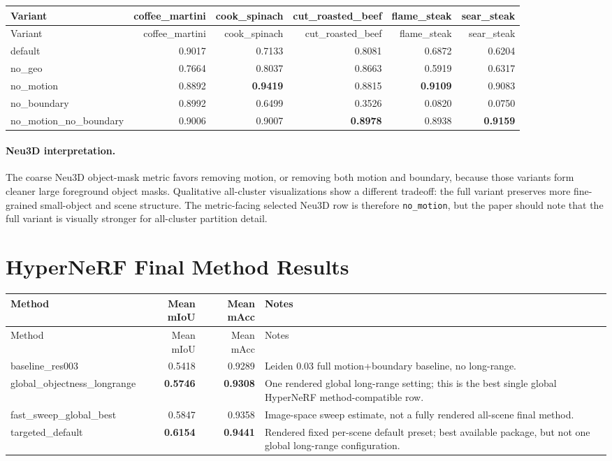 \documentclass[10pt]{article}
\begin{document}
\small
\begin{longtable}{lrrrrr}
\toprule
Variant & coffee\_martini & cook\_spinach & cut\_roasted\_beef & flame\_steak & sear\_steak \\
\midrule
\endfirsthead
\toprule
Variant & coffee\_martini & cook\_spinach & cut\_roasted\_beef & flame\_steak & sear\_steak \\
\midrule
\endhead
default & 0.9017 & 0.7133 & 0.8081 & 0.6872 & 0.6204 \\
no\_geo & 0.7664 & 0.8037 & 0.8663 & 0.5919 & 0.6317 \\
no\_motion & 0.8892 & \textbf{0.9419} & 0.8815 & \textbf{0.9109} & 0.9083 \\
no\_boundary & 0.8992 & 0.6499 & 0.3526 & 0.0820 & 0.0750 \\
no\_motion\_no\_boundary & 0.9006 & 0.9007 & \textbf{0.8978} & 0.8938 & \textbf{0.9159} \\
\bottomrule
\end{longtable}
\normalsize

\paragraph{Neu3D interpretation.}
The coarse Neu3D object-mask metric favors removing motion, or removing both motion and boundary, because those variants form cleaner large foreground object masks.  Qualitative all-cluster visualizations show a different tradeoff: the full variant preserves more fine-grained small-object and scene structure.  The metric-facing selected Neu3D row is therefore \texttt{no\_motion}, but the paper should note that the full variant is visually stronger for all-cluster partition detail.

\section{HyperNeRF Final Method Results}
\small
\begin{longtable}{lrrp{7.6cm}}
\toprule
Method & Mean mIoU & Mean mAcc & Notes \\
\midrule
\endfirsthead
\toprule
Method & Mean mIoU & Mean mAcc & Notes \\
\midrule
\endhead
baseline\_res003 & 0.5418 & 0.9289 & Leiden 0.03 full motion+boundary baseline, no long-range. \\
global\_objectness\_longrange & \textbf{0.5746} & \textbf{0.9308} & One rendered global long-range setting; this is the best single global HyperNeRF method-compatible row. \\
fast\_sweep\_global\_best & 0.5847 & 0.9358 & Image-space sweep estimate, not a fully rendered all-scene final method. \\
targeted\_default & \textbf{0.6154} & \textbf{0.9441} & Rendered fixed per-scene default preset; best available package, but not one global long-range configuration. \\
\bottomrule
\end{longtable}
\normalsize
\end{document}
